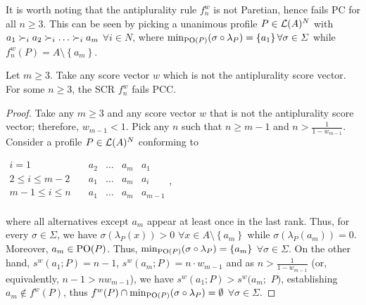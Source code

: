 It is worth noting that the antiplurality rule $f_{n}^{w}$ is not Paretian, hence fails PC  for all $n\geq 3$. This can be seen by picking a unanimous profile $P \in \mathcal{L}(A)^{N}$ with $a_{1}\prefi a_{2}\prefi \dots \prefi a_{m}$ $\forall i\in N$, where $\mustar=\left\{ a_{1}\right\} \forall \sigma \in \Sigma $ while $f_{n}^{w}(P)=A \setminus \left\{ a_{m}\right\}$.

\begin{theorem}
	\label{th:srPCC}
	Let $m\geq 3.$ Take any score vector $w$ which is not the antiplurality score vector. For some $n ≥ 3$, the \ac{SCR} $f_{n}^{w}$ fails PCC.
\end{theorem}

\begin{proof}
	Take any $m\geq 3$ and any score vector $w$ that is not the antiplurality score vector; therefore, $w_{m-1}<1$. Pick any $n$ such that $n ≥ m - 1$ and $n > \frac{1}{1 - w_{m - 1}}$. Consider a profile $P \in \mathcal{L}(A)^N$ conforming to
	
	\begin{center}
		$
		\begin{array}{cccccc}
			i = 1 \quad & a_2 & … & a_m & a_1\\
			2 ≤ i ≤ m - 2 \quad & a_1 & … & a_m & a_i\\
			m - 1 ≤ i ≤ n \quad & a_1 & … & a_m & a_{m-1}\\
		\end{array}
		$\quad,
	\end{center}
	where all alternatives except $a_m$ appear at least once in the last rank.
	Thus, for every $\sigma \in \Sigma$, we have 
	$\sigma (\lambda _{P}(x))>0$ $\forall x\in A \setminus \left\{ a_{m}\right\}$
	while
	$\sigma (\lambda_{P}(a_{m}))=0$. 
	Moreover, $a_{m}\in \text{PO}(P)$. Thus, $\mustar=\left\{ a_{m}\right\} $ $\forall \sigma \in \Sigma $. On the other hand, $s^{w}(a_{1}; P)=n-1$, $s^{w}(a_{m}; P)=n\cdot w_{m-1}$ and
	as $n > \frac{1}{1 - w_{m - 1}}$ (or, equivalently, $n - 1 > n w_{m - 1}$), we have $s^{w}(a_{1}; P)>s^{w}(a_{m};$ $P)$,
	establishing $a_{m}\notin f^{w}(P)$, thus $f^{w}(P)\cap \mustar=\emptyset $ $\forall \sigma \in \Sigma $.
\end{proof}

